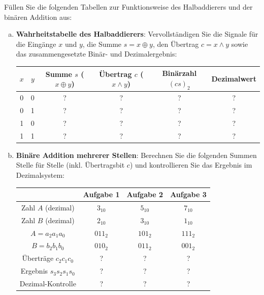 \begin{myexercise}
    Füllen Sie die folgenden Tabellen zur Funktionsweise des Halbaddierers und der binären Addition aus:
    \begin{enumerate}[(a)]
        \item \textbf{Wahrheitstabelle des Halbaddierers}: Vervollständigen Sie die Signale für die Eingänge $x$ und $y$, die Summe $s = x \oplus y$, den Übertrag $c = x \land y$ sowie das zusammengesetzte Binär- und Dezimalergebnis:
        \begin{table}[H]
            \centering
            \begin{tabular}{c|c||c|c|c|c}
                $x$ & $y$ & Summe $s$ ($x \oplus y$) & Übertrag $c$ ($x \land y$) & Binärzahl $(c s)_2$ & Dezimalwert \\ \midrule\midrule
                0 & 0 & ? & ? & ? & ? \\ \midrule
                0 & 1 & ? & ? & ? & ? \\ \midrule
                1 & 0 & ? & ? & ? & ? \\ \midrule
                1 & 1 & ? & ? & ? & ? \\
            \end{tabular}
        \end{table}

        \item \textbf{Binäre Addition mehrerer Stellen}: Berechnen Sie die folgenden Summen Stelle für Stelle (inkl. Übertragsbit $c$) und kontrollieren Sie das Ergebnis im Dezimalsystem:
        \begin{table}[H]
            \centering
            \begin{tabular}{c||c|c|c}
                & \textbf{Aufgabe 1} & \textbf{Aufgabe 2} & \textbf{Aufgabe 3} \\ \midrule\midrule
                Zahl $A$ (dezimal) & $3_{10}$ & $5_{10}$ & $7_{10}$ \\
                Zahl $B$ (dezimal) & $2_{10}$ & $3_{10}$ & $1_{10}$ \\ \midrule
                $A = a_2 a_1 a_0$ & $011_2$ & $101_2$ & $111_2$ \\
                $B = b_2 b_1 b_0$ & $010_2$ & $011_2$ & $001_2$ \\ \midrule
                Überträge $c_2 c_1 c_0$ & ? & ? & ? \\
                Ergebnis $s_3 s_2 s_1 s_0$ & ? & ? & ? \\ \midrule
                Dezimal-Kontrolle & ? & ? & ? \\
            \end{tabular}
        \end{table}
    \end{enumerate}


\end{myexercise}
